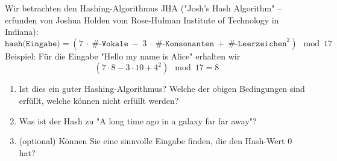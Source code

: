 \documentclass[11pt,a4paper]{report}
\begin{document}
\begin{ex}
Wir betrachten den Hashing-Algorithmus JHA ("Josh's Hash Algorithm" -- erfunden von Joshua Holden vom Rose-Hulman Institute of Technology in Indiana):
\[
\texttt{hash(Eingabe)} = (7\ \cdot\ \texttt{\#-Vokale}\  -\  3\ \cdot \ \texttt{\#-Konsonanten}\  +\  \texttt{\#-Leerzeichen}^2) \mod 17
\]
Beispiel: Für die Eingabe "Hello my name is Alice" erhalten wir
\[
(7\cdot 8 - 3\cdot 10 + 4^2) \mod 17 = 8
\]
\begin{enumerate}
\item Ist dies ein guter Hashing-Algorithmus?
Welche der obigen Bedingungen sind erfüllt, welche können nicht erfüllt werden?
\item Was ist der Hash zu "A long time ago in a galaxy far far away"?
\item (optional) Können Sie eine sinnvolle Eingabe finden, die den Hash-Wert $0$ hat?
\end{enumerate}
\end{ex}


\newpage
\end{document}
